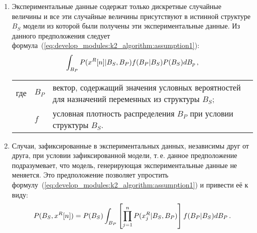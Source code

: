 \begin{enumerate}
  \item
  Экспериментальные данные содержат только дискретные случайные величины и все эти случайные величины присутствуют в истинной структуре $B_S$ модели из которой были получены эти экспериментальные данные.
  Из данного предположения следует формула~(\ref{eq:develop_modules:k2_algorithm:assumption1}):
  \begin{equation}
    \label{eq:develop_modules:k2_algorithm:assumption1}
    \int_{B_P} P(x^R[n] | B_S, B_P) f(B_P | B_S) P(B_S) dB_p \text{\,,}
  \end{equation}
  \par\hspace{\fivecharsapprox} %
  \begin{tabular}{@{}ll@{ --- }p{}}
  где & $ B_P $ & вектор, содержащий значения условных вероятностей для назначений переменных из структуры $ B_S $; \\
      & $ f $ & условная плотность распределения $B_P$ при условии структуры $B_S$. \\[\parsep]
  \end{tabular}

  \item
  Случаи, зафиксированные в экспериментальных данных, независимы друг от друга, при условии зафиксированной модели, т.\,е. данное предположение подразумевает, что модель, генерирующая экспериментальные данные не меняется.
  Это предположение позволяет упростить формулу~(\ref{eq:develop_modules:k2_algorithm:assumption1}) и привести её к виду:
  \begin{equation}
    \label{eq:develop_modules:k2_algorithm:assumption2}
    P(B_S, x^R[n]) =
      P(B_S) \int_{B_P} \left[ \prod_{j = 1}^{n} P(x^R_j | B_S, B_P) \right] f(B_P | B_S) dB_P \text{\,.}
  \end{equation}


\end{enumerate}
